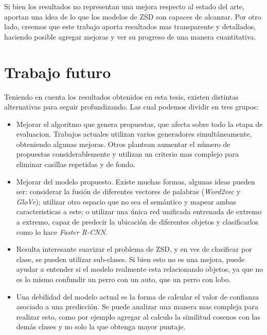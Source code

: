 Si bien los resultados no representan una mejora respecto al estado del arte, aportan una idea de lo que los modelos de ZSD son capaces de alcanzar. Por otro lado, creemos que este trabajo aporta resultados mas transparente y detallados, haciendo posible agregar mejoras y ver su progreso de una manera cuantitativa.


\section{Trabajo futuro} \label{sec:trabajo futuro}

Teniendo en cuenta los resultados obtenidos en esta tesis, existen distintas alternativas para seguir profundizando. Las cual podemos dividir en tres grupos:

\begin{itemize}
	\item Mejorar el algoritmo que genera propuestas, que afecta sobre todo la etapa de evaluacion. Trabajos actuales utilizan varios generadores simultáneamente, obteniendo algunas mejoras. Otros plantean aumentar el número de propuestas considerablemente y utilizan un criterio mas complejo para eliminar casillas repetidas y de fondo.
	\item Mejorar del modelo propuesto. Existe muchas formas, algunas ideas pueden ser: considerar la fusión de diferentes vectores de palabras (\textit{Word2vec} y \textit{GloVe}); utilizar otro espacio que no sea el semántico y mapear ambas caracteristicas a este; o utilizar una única red unificada entrenada de extremo a extremo, capaz de predecir la ubicación de diferentes objetos y clasificarlos como lo hace \textit{Faster R-CNN}.
	\item Resulta interesante suavizar el problema de ZSD, y en ves de clasificar por clase, se pueden utilizar sub-clases. Si bien esto no es una mejora, puede ayudar a entender si el modelo realmente esta relacionando objetos, ya que no es lo mismo confundir un perro con un auto, que un perro con lobo.
	\item Una debilidad del modelo actual es la forma de calcular el valor de confianza asociado a una predicción. Se puede analizar una manera mas compleja para realizar esto, como por ejemplo agregar al calculo la similitud cosenos con las demás clases y no solo la que obtenga mayor puntaje.
\end{itemize}

